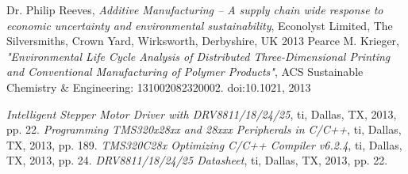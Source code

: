 \begin{thebibliography}{9}
	Dr. Philip Reeves,
	\textit{Additive Manufacturing – A supply chain wide response to economic uncertainty and environmental sustainability},
	Econolyst Limited, The Silversmiths, Crown Yard, Wirksworth, Derbyshire, UK
	2013
	Pearce M. Krieger,
	\textit{"Environmental Life Cycle Analysis of Distributed Three-Dimensional Printing and Conventional Manufacturing of Polymer Products"},
	ACS Sustainable Chemistry \& Engineering: 131002082320002. doi:10.1021,
	2013	

	\textit{Intelligent Stepper Motor Driver with DRV8811/18/24/25},
	\gls{ti}, Dallas, TX,
	2013, pp. 22.
	\textit{Programming TMS320x28xx and 28xxx Peripherals in C/C++},
	\gls{ti}, Dallas, TX,
	2013, pp. 189.
	\textit{TMS320C28x Optimizing C/C++ Compiler v6.2.4},
	\gls{ti}, Dallas, TX,
	2013, pp. 24.
	\textit{DRV8811/18/24/25 Datasheet},
	\gls{ti}, Dallas, TX,
	2013, pp. 22.
\end{thebibliography}
